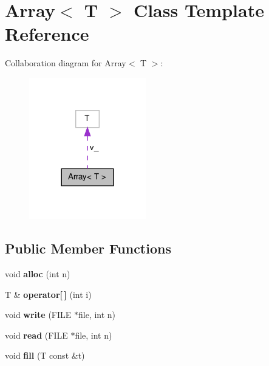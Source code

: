 \hypertarget{classArray}{\section{\-Array$<$ \-T $>$ \-Class \-Template \-Reference}
\label{classArray}
}


\-Collaboration diagram for \-Array$<$ \-T $>$\-:\nopagebreak
\begin{figure}[H]
\begin{center}
\leavevmode
\includegraphics[width=144pt]{classArray__coll__graph}
\end{center}
\end{figure}
\subsection*{\-Public \-Member \-Functions}
\begin{DoxyCompactItemize}
\item 
\hypertarget{classArray_a590e6a7f6a10122acf677b5f7191e9ec}{void {\bfseries alloc} (int n)}\label{classArray_a590e6a7f6a10122acf677b5f7191e9ec}

\item 
\hypertarget{classArray_ae911195ae0ab8040c8780c6fc0a11b1b}{\-T \& {\bfseries operator\mbox{[}$\,$\mbox{]}} (int i)}\label{classArray_ae911195ae0ab8040c8780c6fc0a11b1b}

\item 
\hypertarget{classArray_a1980151be6d25c4d8acaaee358881a0d}{void {\bfseries write} (\-F\-I\-L\-E $\ast$file, int n)}\label{classArray_a1980151be6d25c4d8acaaee358881a0d}

\item 
\hypertarget{classArray_a728430d7e0933b1ab4607ba98255c2ef}{void {\bfseries read} (\-F\-I\-L\-E $\ast$file, int n)}\label{classArray_a728430d7e0933b1ab4607ba98255c2ef}

\item 
\hypertarget{classArray_a3e395a7a0ba33776744d7af2c387ebd8}{void {\bfseries fill} (\-T const \&t)}\label{classArray_a3e395a7a0ba33776744d7af2c387ebd8}

\end{DoxyCompactItemize}
